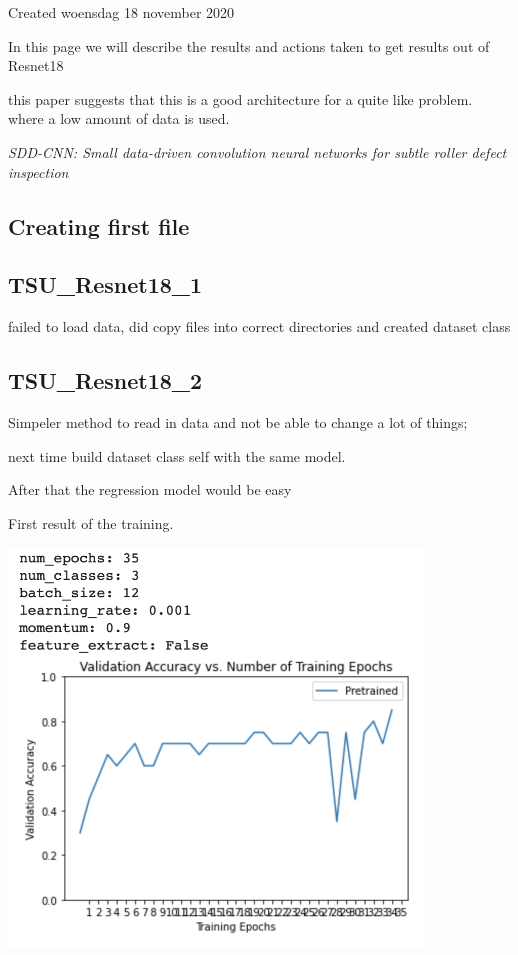 \documentclass{article}
\begin{document}
Created woensdag 18 november 2020



In this page we will describe the results and actions taken to get results out of Resnet18



this paper suggests that this is a good architecture for a quite like problem. where a low amount of data is used.

	\emph{SDD-CNN: Small data-driven convolution neural networks for subtle roller defect inspection}
	


\subsection{Creating first file}



\subsection{TSU\_Resnet18\_1}



failed to load data, did copy files into correct directories and created dataset class



\subsection{TSU\_Resnet18\_2}



Simpeler method to read in data and not be able to change a lot of things;

next time build dataset class self with the same model. 

After that the regression model would be easy



First result of the training.

\includegraphics[height=4.166667in, keepaspectratio=true]{./ZimFiles_files/Vision/GoogleColab/Test_Camera_Setup/Resnet18/Screenshot 2020-11-18 at 22.58.45.png}
\end{document}
